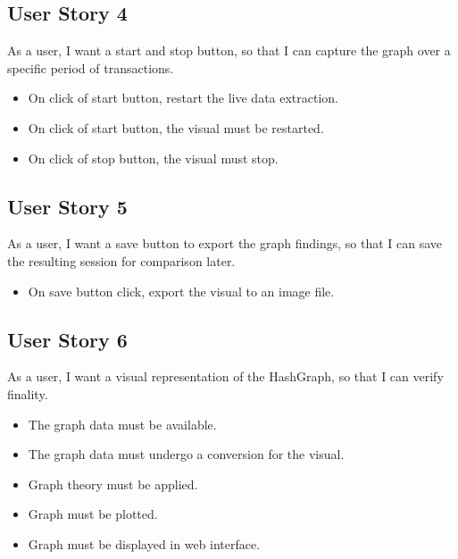 \documentclass[a4paper,10pt]{article}
\begin{document}
\subsection{User Story 4}As a user, I want a start and stop button, so that I can capture the graph over a specific period of transactions.
\begin{itemize}
	\item On click of start button, restart the live data extraction.
	\item On click of start button, the visual must be restarted.
	\item On click of stop button, the visual must stop.
\end{itemize}
\subsection{User Story 5} As a user, I want a save button to export the graph findings, so that I can save the resulting session for comparison later.
\begin{itemize}
	\item On save button click, export the visual to an image file.
\end{itemize}
\subsection{User Story 6} As a user, I want a visual representation of the HashGraph, so that I can verify finality.
\begin{itemize}
	\item The graph data must be available.
	\item The graph data must undergo a conversion for the visual.
	\item Graph theory must be applied.
	\item Graph must be plotted.
	\item Graph must be displayed in web interface.
\end{itemize}
\end{document}
